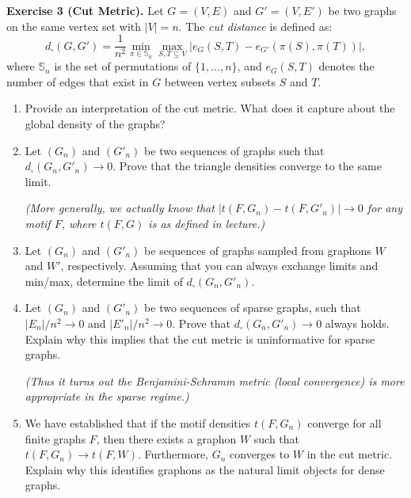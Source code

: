 \documentclass{article}
\begin{document}
\begin{tcolorbox}[colback = gray!16, enhanced, boxrule=0pt, frame hidden, sharp corners, borderline west={3pt}{-1.5pt}{black!80},breakable]
\textbf{Exercise 3 (Cut Metric).} Let $G=(V,E)$ and $G'=(V,E')$ be two graphs on the same vertex set with $|V|=n$. The \textit{cut distance} is defined as:$$d_{\square}(G,G') = \frac{1}{n^2} \min_{\pi \in \mathbb{S}_n} \max_{S,T \subseteq V} \Big| e_G(S,T) - e_{G'}(\pi(S),\pi(T)) \Big|,$$where $\mathbb{S}_n$ is the set of permutations of $\{1, \hdots, n\}$, and $e_G(S,T)$ denotes the number of edges that exist in $G$ between vertex subsets $S$ and $T$.
\begin{enumerate}[$(a)$]
\item Provide an interpretation of the cut metric. What does it capture about the global density of the graphs?

    \item Let $(G_n)$ and $(G'_n)$ be two sequences of graphs such that $d_\square(G_n,G'_n) \to 0$. Prove that the triangle densities converge to the same limit.
    
\textit{(More generally, we actually know that $|t(F,G_n) - t(F,G'_n)| \to 0$ for any motif $F$, where $t(F,G)$ is as defined in lecture.)
}
    \item Let $(G_n)$ and $(G'_n)$ be sequences of graphs sampled from graphons $W$ and $W'$, respectively. Assuming that you can always exchange limits and min/max, determine the limit of $d_\square(G_n,G'_n)$.
    \item Let $(G_n)$ and $(G'_n)$ be two sequences of sparse graphs, such that $|E_n|/n^2 \to 0$ and $|E'_n|/n^2 \to 0$. Prove that $d_\square(G_n,G'_n) \to 0$ always holds. Explain why this implies that the cut metric is uninformative for sparse graphs.
    
\textit{(Thus it turns out the Benjamini-Schramm metric (local convergence) is more appropriate in the sparse regime.)
}    \item We have established that if the motif densities $t(F, G_n)$ converge for all finite graphs $F$, then there exists a graphon $W$ such that $t(F, G_n) \to t(F, W)$. Furthermore, $G_n$ converges to $W$ in the cut metric. Explain why this identifies graphons as the natural limit objects for dense graphs.
\end{enumerate}
\end{tcolorbox}
\end{document}
